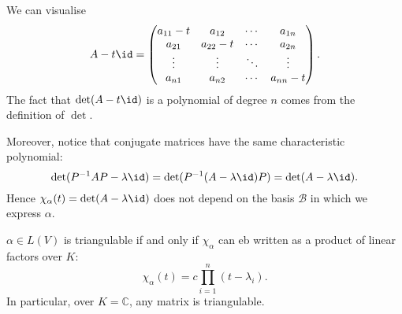 \documentclass[12pt]{article}
\begin{document}
\begin{remark}
	We can visualise
	\[
	A - t \id =
	\begin{pmatrix}
		a_{11} - t & a_{12} & \cdots & a_{1n} \\
		a_{21} & a_{22} - t & \cdots & a_{2n} \\
		\vdots & \vdots & \ddots & \vdots \\
		a_{n1} & a_{n2} & \cdots & a_{nn} - t
	\end{pmatrix}
	.\]
	The fact that $\det(A - t \id)$ is a polynomial of degree $n$ comes from the definition of $\det$.

	Moreover, notice that conjugate matrices have the same characteristic polynomial:
	\[
		\det(P^{-1}AP - \lambda \id) = \det(P^{-1}(A - \lambda \id)P) = \det(A - \lambda \id)
	.\]
	Hence $\chi_\alpha(t) = \det(A - \lambda \id)$ does not depend on the basis $\mathcal{B}$ in which we express $\alpha$.
\end{remark}

\begin{theorem} 
	$\alpha \in L(V)$ is triangulable if and only if $\chi_\alpha$ can eb written as a product of linear factors over $K$:
	\[
		\chi_\alpha(t) = c \prod_{i = 1}^{n} (t - \lambda_i)
	.\]
	In particular, over $K = \mathbb{C}$, any matrix is triangulable.
\end{theorem}
\end{document}
